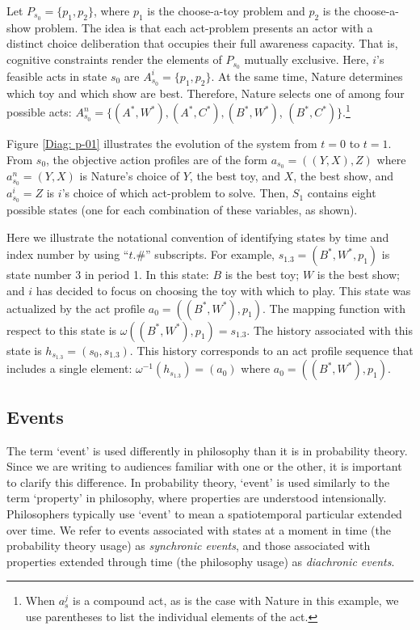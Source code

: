 \documentclass[
11pt,
titlepage,
reqno,
]{article}%
\theoremstyle{definition}
\begin{document}
Let $P_{s_0}=\{p_1,p_2\}$, where $p_1$ is the choose-a-toy problem and $p_2$ is the choose-a-show problem.
The idea is that each act-problem presents an actor with a distinct choice deliberation that occupies their full awareness capacity.
That is, cognitive constraints render the elements of $P_{s_0}$ mutually exclusive.
Here, $i$'s feasible acts in state $s_0$ are  $A^i_{s_0}=\{p_1,p_2\}$.
At the same time, Nature determines which toy and which show are best.
Therefore, Nature selects one of among four possible acts: $A^n_{s_0}=\{(A^\ast,W^\ast),(A^\ast,C^\ast),(B^\ast,W^\ast)$, $(B^\ast,C^\ast)\}$.\footnote
{
	When $a^j_s$ is a compound act, as is the case with Nature in this example, we use parentheses to list the individual elements of the act.
}

Figure \ref{Diag: p-01} illustrates the evolution of the system from $t=0$ to $t=1$. 
From $s_0$, the objective action profiles are of the form $a_{s_0}=((Y,X),Z)$ where $a^n_{s_0}=(Y,X)$ is Nature's choice of  $Y$, the best toy, and $X$, the best show, and $a^i_{s_0}=Z$ is $i$'s choice of which act-problem to solve.
Then, $S_1$ contains eight possible states (one for each combination of these variables, as shown).

Here we illustrate the notational convention of identifying states by time and index number by using ``$t.\#$'' subscripts.
For example, $s_{1.3}=(B^\ast,W^\ast,p_1)$ is state number 3 in period 1.
In this state: $B$ is the best toy; $W$ is the best show; and $i$ has decided to focus on choosing the toy with which to play.
This state was actualized by the act profile $a_0=((B^\ast,W^\ast),p_1)$.
The mapping function with respect to this state is $\omega((B^\ast,W^\ast),p_1)=s_{1.3}$.
The history associated with this state is $h_{s_{1.3}}=(s_0,s_{1.3})$.
This history corresponds to an act profile  sequence that includes a single element:  $\omega^{-1}(h_{s_{1.3}})=(a_0)$ where $a_0=((B^\ast,W^\ast),p_1)$.
	
	
\subsection{Events}

The term `event' is used differently in philosophy than it is in probability theory. 
Since we are writing to audiences familiar with one or the other, it is important to clarify this difference. 
In probability theory, `event' is used similarly to the term `property' in philosophy, where properties are understood intensionally. 
Philosophers typically use `event' to mean a spatiotemporal particular extended over time. 
We refer to events associated with states at a moment in time (the probability theory usage) as \textit{synchronic events}, and those associated with properties extended through time (the philosophy usage) as \textit{diachronic events}.
\end{document}
